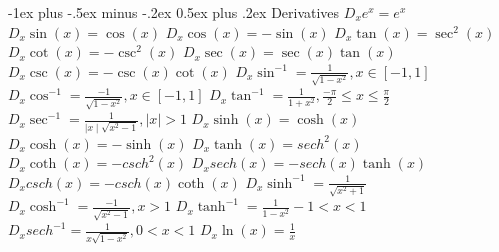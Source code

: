\documentclass[10pt,landscape]{article}
\makeatletter
\renewcommand{\section}{\@startsection{section}{1}{0mm}%
                                {-1ex plus -.5ex minus -.2ex}%
                                {0.5ex plus .2ex}%
                                {\normalfont\large\bfseries}}
\makeatother
\begin{document}
\raggedright
\footnotesize
\begin{multicols*}{5}


\setlength{\premulticols}{1pt}
\setlength{\postmulticols}{1pt}
\setlength{\multicolsep}{1pt}
\setlength{\columnsep}{2pt}

\section{Derivatives}
\scriptsize
$D_x e^x=e^x$\newline
$D_x \sin(x)=\cos(x)$\newline
$D_x \cos(x)=-\sin(x)$\newline
$D_x \tan(x)=\sec^2(x)$\newline
$D_x \cot(x)=-\csc^2(x)$\newline
$D_x \sec(x)=\sec(x)\tan(x)$\newline
$D_x \csc(x)=-\csc(x)\cot(x)$\newline
$D_x \sin^{-1}=\frac{1}{\sqrt{1-x^2}}, x \in [-1,1]$\newline
$D_x \cos^{-1}=\frac{-1}{\sqrt{1-x^2}}, x \in [-1,1]$\newline
$D_x \tan^{-1}=\frac{1}{1+x^2}, \frac{-\pi}{2}\le x \le \frac{\pi}{2}$\newline
$D_x \sec^{-1}=\frac{1}{\mid x \mid \sqrt{x^2-1}}, |x| > 1$\newline
$D_x \sinh(x)=\cosh(x)$\newline
$D_x \cosh(x)=-\sinh(x)$\newline
$D_x \tanh(x)=sech^2(x)$\newline
$D_x \coth(x)=-csch^2(x)$\newline
$D_x sech(x)=-sech(x)\tanh(x)$\newline
$D_x csch(x)=-csch(x)\coth(x)$\newline
$D_x \sinh^{-1}=\frac{1}{\sqrt{x^2+1}}$\newline
$D_x \cosh^{-1}=\frac{-1}{\sqrt{x^2-1}}, x > 1$\newline
$D_x \tanh^{-1}=\frac{1}{1-x^2} -1 < x < 1$\newline
$D_x sech^{-1}=\frac{1}{x \sqrt{1-x^2}}, 0 < x < 1$
$ D_x \ln(x) = \frac{1}{x} $


\end{multicols*}
\end{document}
